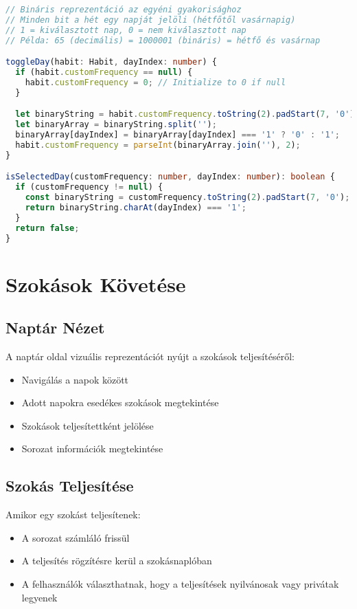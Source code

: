 \documentclass[12pt,a4paper]{report}
\begin{document}
\begin{lstlisting}[language=typescript]
// Bináris reprezentáció az egyéni gyakorisághoz
// Minden bit a hét egy napját jelöli (hétfőtől vasárnapig)
// 1 = kiválasztott nap, 0 = nem kiválasztott nap
// Példa: 65 (decimális) = 1000001 (bináris) = hétfő és vasárnap

toggleDay(habit: Habit, dayIndex: number) {
  if (habit.customFrequency == null) {
    habit.customFrequency = 0; // Initialize to 0 if null
  }

  let binaryString = habit.customFrequency.toString(2).padStart(7, '0');
  let binaryArray = binaryString.split('');
  binaryArray[dayIndex] = binaryArray[dayIndex] === '1' ? '0' : '1';
  habit.customFrequency = parseInt(binaryArray.join(''), 2);
}

isSelectedDay(customFrequency: number, dayIndex: number): boolean {
  if (customFrequency != null) {
    const binaryString = customFrequency.toString(2).padStart(7, '0');
    return binaryString.charAt(dayIndex) === '1';
  }
  return false;
}
\end{lstlisting}

\section{Szokások Követése}
\subsection{Naptár Nézet}
A naptár oldal vizuális reprezentációt nyújt a szokások teljesítéséről:
\begin{itemize}
    \item Navigálás a napok között
    \item Adott napokra esedékes szokások megtekintése
    \item Szokások teljesítettként jelölése
    \item Sorozat információk megtekintése
\end{itemize}

\subsection{Szokás Teljesítése}
Amikor egy szokást teljesítenek:
\begin{itemize}
    \item A sorozat számláló frissül
    \item A teljesítés rögzítésre kerül a szokásnaplóban
    \item A felhasználók választhatnak, hogy a teljesítések nyilvánosak vagy privátak legyenek
\end{itemize}
\end{document}
